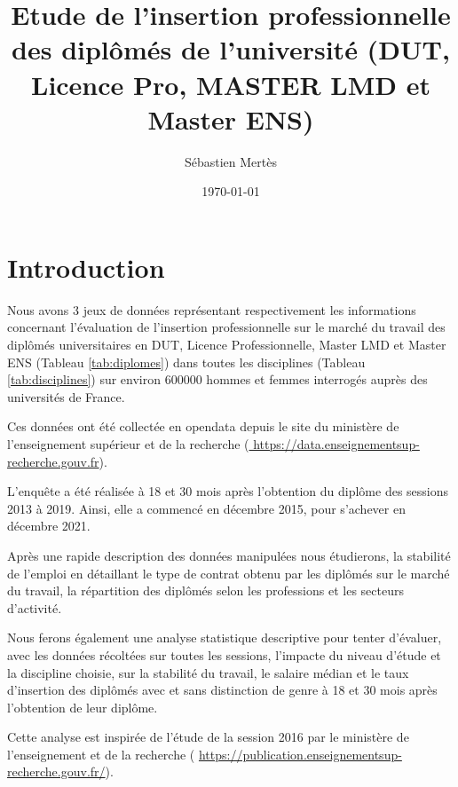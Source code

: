 \documentclass[12pt, a4paper, titlepage, table]{article}
\begin{document}
	\label{document}
	\title{Etude de l'insertion professionnelle des diplômés de l'université (DUT, Licence Pro, MASTER LMD et Master ENS)}
	\author{Sébastien Mertès}
	\date{\today}
	\maketitle
	\renewcommand{\thesection}{\arabic{section}.}
	\renewcommand{\thesubsection}{\thesection\arabic{subsection}}
	\renewcommand{\tablename}{Tableau}
	\renewcommand{\abstractname}{Résumé}
	\setlength{\parindent}{0pt}
	\captionsetup{labelfont=bf, font=small}
	\tableofcontents
	\newpage
	
\section{Introduction}
	Nous avons 3 jeux de données représentant respectivement les informations concernant l'évaluation de l'insertion professionnelle sur le marché du travail des diplômés universitaires en DUT, Licence Professionnelle, Master LMD et Master ENS (Tableau \ref{tab:diplomes}) dans toutes les disciplines (Tableau \ref{tab:disciplines}) sur environ 600000 hommes et femmes interrogés auprès des universités de France.
	
	Ces données ont été collectée en opendata depuis le site du ministère de l'enseignement supérieur et de la recherche (\url{ https://data.enseignementsup-recherche.gouv.fr}).
	
	L'enquête a été réalisée à 18 et 30 mois après l'obtention du diplôme des sessions  2013 à 2019. Ainsi, elle a commencé en décembre 2015, pour s'achever en décembre 2021.
	
	Après une rapide description des données manipulées nous étudierons, la stabilité de l'emploi en détaillant le type de contrat obtenu par les diplômés sur le marché du travail, la répartition des diplômés selon les professions et les secteurs d'activité.
	
	Nous ferons également une analyse statistique descriptive pour tenter d'évaluer, avec les données récoltées sur toutes les sessions, l'impacte du niveau d'étude et la discipline choisie,  sur la stabilité du travail, le salaire médian  et le taux d'insertion des diplômés avec et sans distinction de genre à 18 et 30 mois après l'obtention de leur diplôme.

	Cette analyse est inspirée de l'étude de la session 2016 par le ministère de l'enseignement et de la recherche ( \url{https://publication.enseignementsup-recherche.gouv.fr/}).
	
\end{document}
